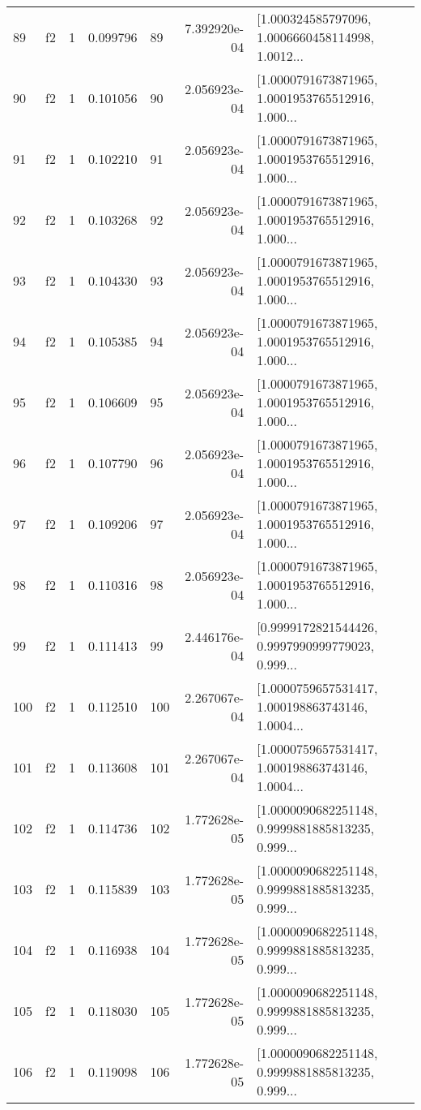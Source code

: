 \begin{tabular}{lllrlrl}
89  &  f2 &   1 &  0.099796 &   89 &  7.392920e-04 &  [1.000324585797096, 1.0006660458114998, 1.0012... \\
90  &  f2 &   1 &  0.101056 &   90 &  2.056923e-04 &  [1.0000791673871965, 1.0001953765512916, 1.000... \\
91  &  f2 &   1 &  0.102210 &   91 &  2.056923e-04 &  [1.0000791673871965, 1.0001953765512916, 1.000... \\
92  &  f2 &   1 &  0.103268 &   92 &  2.056923e-04 &  [1.0000791673871965, 1.0001953765512916, 1.000... \\
93  &  f2 &   1 &  0.104330 &   93 &  2.056923e-04 &  [1.0000791673871965, 1.0001953765512916, 1.000... \\
94  &  f2 &   1 &  0.105385 &   94 &  2.056923e-04 &  [1.0000791673871965, 1.0001953765512916, 1.000... \\
95  &  f2 &   1 &  0.106609 &   95 &  2.056923e-04 &  [1.0000791673871965, 1.0001953765512916, 1.000... \\
96  &  f2 &   1 &  0.107790 &   96 &  2.056923e-04 &  [1.0000791673871965, 1.0001953765512916, 1.000... \\
97  &  f2 &   1 &  0.109206 &   97 &  2.056923e-04 &  [1.0000791673871965, 1.0001953765512916, 1.000... \\
98  &  f2 &   1 &  0.110316 &   98 &  2.056923e-04 &  [1.0000791673871965, 1.0001953765512916, 1.000... \\
99  &  f2 &   1 &  0.111413 &   99 &  2.446176e-04 &  [0.9999172821544426, 0.9997990999779023, 0.999... \\
100 &  f2 &   1 &  0.112510 &  100 &  2.267067e-04 &  [1.0000759657531417, 1.000198863743146, 1.0004... \\
101 &  f2 &   1 &  0.113608 &  101 &  2.267067e-04 &  [1.0000759657531417, 1.000198863743146, 1.0004... \\
102 &  f2 &   1 &  0.114736 &  102 &  1.772628e-05 &  [1.0000090682251148, 0.9999881885813235, 0.999... \\
103 &  f2 &   1 &  0.115839 &  103 &  1.772628e-05 &  [1.0000090682251148, 0.9999881885813235, 0.999... \\
104 &  f2 &   1 &  0.116938 &  104 &  1.772628e-05 &  [1.0000090682251148, 0.9999881885813235, 0.999... \\
105 &  f2 &   1 &  0.118030 &  105 &  1.772628e-05 &  [1.0000090682251148, 0.9999881885813235, 0.999... \\
106 &  f2 &   1 &  0.119098 &  106 &  1.772628e-05 &  [1.0000090682251148, 0.9999881885813235, 0.999... \\

\end{tabular}
